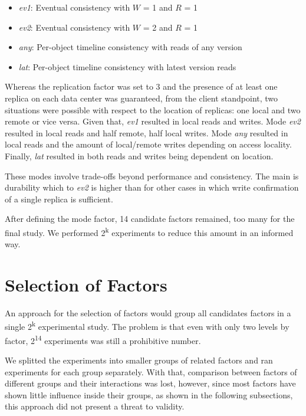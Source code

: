 \documentclass[doublespacing]{bmcart}
\begin{document}
\begin{itemize}

\item \textit{ev1}: Eventual consistency with $W$ = 1 and $R$ = 1

\item \textit{ev2}: Eventual consistency with $W$ = 2 and $R$ = 1

\item \textit{any}: Per-object timeline consistency with reads of any version

\item \textit{lat}: Per-object timeline consistency with latest version reads

\end{itemize}

Whereas the replication factor was set to 3 and the presence of at least one replica
on each data center was guaranteed, from the client standpoint, two situations were possible with respect to the location
of replicas: one local and two remote or vice versa. Given that,
\textit{ev1} resulted in local reads and writes. Mode \textit{ev2} resulted in
local reads and half remote, half local writes. Mode \textit{any} resulted in
local reads and the amount of local/remote writes depending on access locality.
Finally, \textit{lat} resulted in both reads and writes being dependent on location.

These modes involve trade-offs beyond performance and consistency. The main is
durability which to \textit{ev2} is higher than for other cases in which write
confirmation of a single replica is sufficient.

After defining the mode factor, 14 candidate factors remained, too many for the final study. We performed 2\textsuperscript{k} experiments to reduce this amount in an informed way.

\section{Selection of Factors}

An approach for the selection of factors would group all candidates factors in a
single 2\textsuperscript{k} experimental study. The problem is that even with
only two levels by factor, 2\textsuperscript{14} experiments was still a prohibitive number.

We splitted the experiments into smaller groups of related factors and
ran experiments for each group separately. With that, comparison between factors of
different groups and their interactions was lost, however, since most factors
have shown little influence inside their groups, as shown in the following
subsections, this approach did not present a threat to validity.
\end{document}
